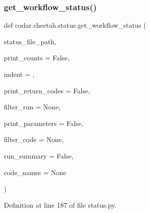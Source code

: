 \subsubsection{\texorpdfstring{get\+\_\+workflow\+\_\+status()}{get\_workflow\_status()}}
{\footnotesize\ttfamily def codar.\+cheetah.\+status.\+get\+\_\+workflow\+\_\+status (\begin{DoxyParamCaption}\item[{}]{status\+\_\+file\+\_\+path,  }\item[{}]{print\+\_\+counts = {\ttfamily False},  }\item[{}]{indent = {},  }\item[{}]{print\+\_\+return\+\_\+codes = {\ttfamily False},  }\item[{}]{filter\+\_\+run = {\ttfamily None},  }\item[{}]{print\+\_\+parameters = {\ttfamily False},  }\item[{}]{filter\+\_\+code = {\ttfamily None},  }\item[{}]{run\+\_\+summary = {\ttfamily False},  }\item[{}]{code\+\_\+names = {\ttfamily None} }\end{DoxyParamCaption})}



Definition at line 187 of file status.\+py.

\mbox{\label{namespacecodar_1_1cheetah_1_1status_ae435d1016a5cd6b962afc42f79dfaee7}} 
